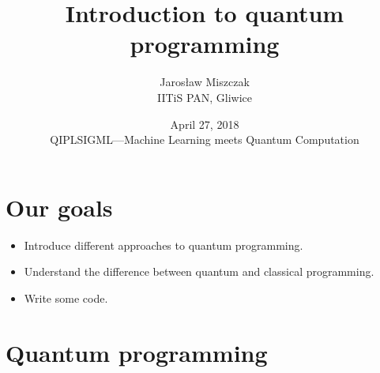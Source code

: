 \documentclass{beamer}
\title[A]{Introduction to quantum programming}
\author{Jaros\l aw Miszczak\\ IITiS PAN, Gliwice}
\date{April 27, 2018\\ QIPLSIGML---Machine Learning meets Quantum Computation}
\begin{document}
\begin{frame}{}
   \maketitle 
\end{frame}

\begin{frame}{}
  \tableofcontents[hideallsubsections]
\end{frame}

\section{Our goals}

\begin{frame}{\insertsection}{\insertsubsection}
    \begin{itemize}
        \item<1-> Introduce different approaches to quantum programming.
        \item<2-> Understand the difference between quantum and classical 
        programming.
        \item<3-> Write some code.\\ 
    \end{itemize}
\end{frame}


\section{Quantum programming}

\begin{frame}
    \begin{center}
        {\color{iitis-orange} \LARGE \insertsection}
    \end{center}
\end{frame}
\end{document}
